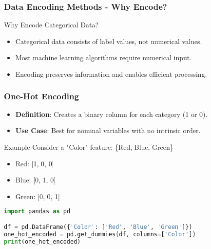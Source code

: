 \documentclass[aspectratio=169]{beamer}
\begin{document}
\begin{frame}[fragile]
    \frametitle{Data Encoding Methods - Why Encode?}
    \begin{block}{Why Encode Categorical Data?}
        \begin{itemize}
            \item Categorical data consists of label values, not numerical values.
            \item Most machine learning algorithms require numerical input.
            \item Encoding preserves information and enables efficient processing.
        \end{itemize}
    \end{block}
\end{frame}

\begin{frame}[fragile]
    \frametitle{One-Hot Encoding}
    \begin{itemize}
        \item \textbf{Definition}: Creates a binary column for each category (1 or 0).
        \item \textbf{Use Case}: Best for nominal variables with no intrinsic order.
    \end{itemize}
    \begin{block}{Example}
        Consider a "Color" feature: \{Red, Blue, Green\}
        \begin{itemize}
            \item Red: [1, 0, 0]
            \item Blue: [0, 1, 0]
            \item Green: [0, 0, 1]
        \end{itemize}
    \end{block}
    \begin{lstlisting}[language=Python]
import pandas as pd

df = pd.DataFrame({'Color': ['Red', 'Blue', 'Green']})
one_hot_encoded = pd.get_dummies(df, columns=['Color'])
print(one_hot_encoded)
    \end{lstlisting}
\end{frame}
\end{document}
